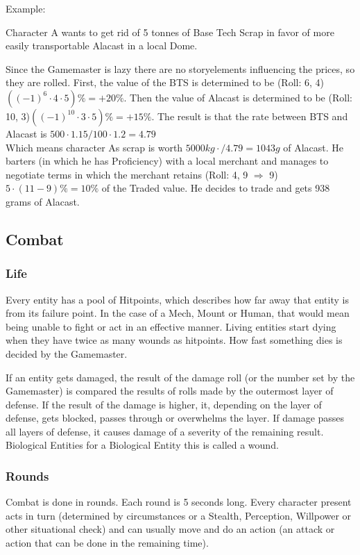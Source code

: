 \documentclass{article}
\begin{document}
    \newline
    Example:\par
    Character A wants to get rid of 5 tonnes of Base Tech Scrap in favor of more easily transportable Alacast in a local
    Dome.\par
    Since the Gamemaster is lazy there are no storyelements influencing the prices, so they are rolled. First, the value of
    the BTS is determined to be (Roll: 6, 4) \(((-1)^{6}\cdot4\cdot5) \% = +20\%\). Then the value of Alacast is determined
    to be (Roll: 10, 3)\(((-1)^{10}\cdot3\cdot5) \% = +15\%\). The result is that the rate between BTS and Alacast is
    \( 500\cdot1.15/100\cdot1.2 = 4.79\) \\ Which means character As scrap is worth
    \(5000 kg\cdot / 4.79 = 1043 g \) of Alacast. He barters (in which he has Proficiency) with a local merchant and manages to
    negotiate terms in which the merchant retains (Roll: 4, 9 \(\Rightarrow\) 9) \(5\cdot(11-9)\% = 10\%\) of the Traded
    value. He decides to trade and gets 938 grams of Alacast.\newline\newline
    \pagebreak[1]
    \subsection{Combat}

    \subsubsection{Life}
    Every entity has a pool of Hitpoints, which describes how far away that entity is from its failure point.
    In the case of a Mech, Mount or Human, that would mean being unable to fight or act in an effective manner. Living
    entities start dying when they have twice as many wounds as hitpoints. How fast something dies is decided by the
    Gamemaster.\par
    If an entity gets damaged, the result of the damage roll (or the number set by the Gamemaster) is compared the results
    of rolls made by the outermost layer of defense. If the result of the damage is higher, it, depending on the
    layer of defense, gets blocked, passes through or overwhelms the layer. If damage passes all layers of defense,
    it causes damage of a severity of the remaining result.
    Biological Entities for a Biological Entity this is called a wound.

    \subsubsection{Rounds}
    Combat is done in rounds. Each round is 5 seconds long. Every character present acts in turn (determined
    by circumstances or a Stealth, Perception, Willpower or other situational check) and can usually move and do an action
    (an attack or action that can be done in the remaining time).
\end{document}
